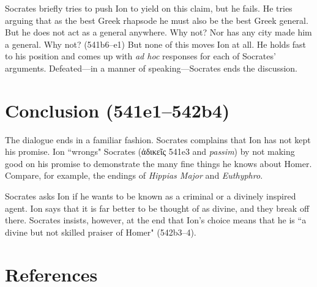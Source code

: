 \documentclass[11pt,letterpaper]{article}
\begin{document}
Socrates briefly tries to push Ion to yield on this claim, but he fails. He tries arguing that as the best Greek rhapsode he must also be the best Greek general. But he does not act as a general anywhere. Why not?  Nor has any city made him a general. Why not? (541b6--e1) But none of this moves Ion at all. He holds fast to his position and comes up with \textit{ad hoc} responses for each of Socrates' arguments. Defeated---in a manner of speaking---Socrates ends the discussion.


\section{Conclusion (541e1--542b4)}

The dialogue ends in a familiar fashion. Socrates complains that Ion has not kept his promise. Ion ``wrongs" Socrates (\textgreek{ἀδικεῖς} 541e3 and \textit{passim}) by not making good on his promise to demonstrate the many fine things he knows about Homer. Compare, for example, the endings of \textit{Hippias Major} and \textit{Euthyphro}.

Socrates asks Ion if he wants to be known as a criminal or a divinely inspired agent. Ion says that it is far better to be thought of as divine, and they break off there. Socrates insists, however, at the end that Ion's choice means that he is ``a divine but not skilled praiser of Homer" (542b3--4).


\newpage
\section{References}
\printbibliography[heading=none]
\end{document}
